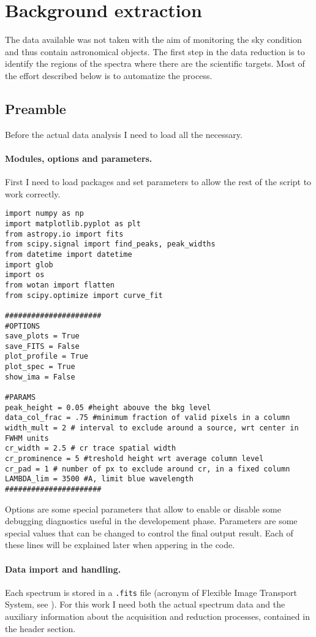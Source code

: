 \section{Background extraction}
The data available was not taken with the aim of monitoring the sky condition and thus contain astronomical objects. The first step in the data reduction is to identify the regions of the spectra where there are the scientific targets. Most of the effort described below is to automatize the process.

\subsection{Preamble}
Before the actual data analysis I need to load all the necessary.

\paragraph{Modules, options and parameters.}
First I need to load packages and set parameters to allow the rest of the script to work correctly.
\begin{lstlisting}
import numpy as np
import matplotlib.pyplot as plt
from astropy.io import fits
from scipy.signal import find_peaks, peak_widths
from datetime import datetime
import glob
import os
from wotan import flatten
from scipy.optimize import curve_fit

######################
#OPTIONS
save_plots = True
save_FITS = False
plot_profile = True
plot_spec = True
show_ima = False

#PARAMS
peak_height = 0.05 #height abouve the bkg level
data_col_frac = .75 #minimum fraction of valid pixels in a column
width_mult = 2 # interval to exclude around a source, wrt center in FWHM units
cr_width = 2.5 # cr trace spatial width
cr_prominence = 5 #treshold height wrt average column level
cr_pad = 1 # number of px to exclude around cr, in a fixed column
LAMBDA_lim = 3500 #A, limit blue wavelength
######################
\end{lstlisting}
Options are some special parameters that allow to enable or disable some debugging diagnostics useful in the developement phase. Parameters are some special values that can be changed to control the final output result. Each of these lines will be explained later when appering in the code.

\paragraph{Data import and handling.} Each spectrum is stored in a \texttt{.fits} file (acronym of Flexible Image Transport System, see ). For this work I need both the actual spectrum data and the auxiliary information about the acquisition and reduction processes, contained in the header section.

